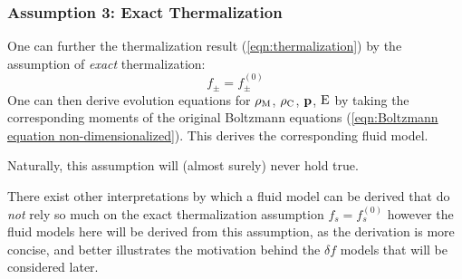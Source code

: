 \subsubsection*{Assumption 3: Exact Thermalization}
    One can further the thermalization result (\ref{eqn:thermalization}) by the assumption of \emph{exact} thermalization:
    \begin{equation}
      f_{\pm}  =  f_{\pm}^{(0)}
    \end{equation}
    One can then derive evolution equations for $\rho_{\mathrm{M}}$, $\rho_{\mathrm{C}}$, $\mathbf{p}$, $\mathrm{E}$ by taking the corresponding moments of the original Boltzmann equations (\ref{eqn:Boltzmann equation non-dimensionalized}). This derives the corresponding fluid model.

    \begin{remark}
        Naturally, this assumption will (almost surely) never hold true.
        
        There exist other interpretations by which a fluid model can be derived that do \emph{not} rely so much on the exact thermalization assumption $f_{s}  =  f_{s}^{(0)}$  however the fluid models here will be derived from this assumption, as the derivation is more concise, and better illustrates the motivation behind the $\delta\!f$ models that will be considered later. 
    \end{remark}

